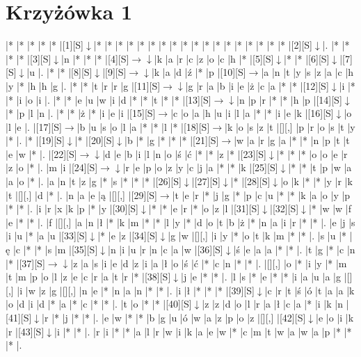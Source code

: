 \documentclass[11pt]{article}
\newcommand\drarr{$\rightarrow \!\!\!\!\! \downarrow$}
\newcommand\rarr{$\rightarrow$}
\newcommand\darr{$\downarrow$}
\begin{document}
\newpage\section*{Krzyżówka 1}

\noindent\begin{Puzzle}{24}{32}|*	|*	|*	|*	|*	|[1][S]\darr	|*	|*	|*	|*	|*	|*	|*	|*	|*	|*	|*	|*	|*	|*	|*	|*	|*	|*	|[2][S]\darr	|.
|*	|*	|*	|*	|[3][S]\darr	|n	|*	|*	|*	|[4][S]\drarr	|k	|a	|r	|c	|z	|o	|c	|h	|*	|[5][S]\darr	|*	|*	|[6][S]\darr	|[7][S]\darr	|u	|.
|*	|*	|[8][S]\darr	|[9][S]\drarr	|k	|a	|d	|ź	|*	|p	|[10][S]\rarr	|a	|n	|t	|y	|s	|z	|a	|c	|h	|y	|*	|h	|h	|g	|.
|*	|*	|t	|r	|r	|g	|[11][S]\drarr	|g	|r	|a	|b	|i	|e	|ż	|c	|a	|*	|*	|[12][S]\darr	|i	|*	|*	|i	|o	|i	|.
|*	|*	|e	|u	|w	|i	|d	|*	|*	|t	|*	|*	|[13][S]\drarr	|n	|p	|r	|*	|*	|h	|p	|[14][S]\darr	|*	|p	|l	|n	|.
|*	|*	|ż	|*	|i	|e	|i	|[15][S]\rarr	|c	|o	|a	|h	|u	|i	|l	|a	|*	|*	|i	|e	|k	|[16][S]\darr	|o	|l	|e	|.
|[17][S]\rarr	|b	|u	|s	|o	|l	|a	|*	|*	|l	|*	|[18][S]\rarr	|k	|o	|s	|z	|t	|[][,]{ }	|p	|r	|o	|s	|t	|y	|*	|.
|*	|[19][S]\darr	|*	|[20][S]\darr	|b	|*	|g	|*	|*	|*	|[21][S]\rarr	|w	|a	|r	|g	|a	|*	|*	|n	|p	|t	|t	|e	|w	|*	|.
|[22][S]\drarr	|d	|e	|b	|i	|l	|n	|o	|ś	|ć	|*	|*	|z	|*	|[23][S]\darr	|*	|*	|*	|o	|o	|e	|r	|z	|o	|*	|.
|m	|i	|[24][S]\drarr	|r	|e	|p	|o	|z	|y	|c	|j	|a	|*	|*	|k	|[25][S]\darr	|*	|*	|t	|p	|w	|a	|a	|o	|*	|.
|a	|n	|t	|z	|g	|*	|s	|*	|*	|*	|[26][S]\darr	|[27][S]\darr	|*	|[28][S]\darr	|o	|k	|*	|*	|y	|r	|k	|t	|[][,]{ }	|d	|*	|.
|n	|a	|e	|ą	|[][,]{ }	|[29][S]\rarr	|t	|e	|r	|*	|j	|g	|*	|p	|c	|u	|*	|*	|k	|a	|o	|y	|p	|*	|*	|.
|i	|r	|x	|k	|p	|*	|y	|[30][S]\darr	|*	|*	|e	|r	|*	|o	|z	|l	|[31][S]\darr	|[32][S]\darr	|*	|w	|w	|f	|e	|*	|*	|.
|f	|[][,]{ }	|a	|n	|ł	|*	|k	|m	|*	|*	|l	|y	|*	|d	|o	|t	|b	|ż	|*	|n	|a	|i	|r	|*	|*	|.
|e	|j	|s	|i	|u	|*	|a	|u	|[33][S]\darr	|*	|e	|z	|[34][S]\darr	|g	|w	|[][,]{ }	|i	|y	|*	|o	|t	|k	|m	|*	|*	|.
|s	|u	|*	|ę	|c	|*	|*	|s	|m	|[35][S]\darr	|n	|i	|u	|r	|n	|c	|a	|w	|[36][S]\darr	|ś	|e	|a	|a	|*	|*	|.
|t	|g	|*	|c	|n	|*	|[37][S]\drarr	|z	|a	|s	|i	|e	|d	|z	|i	|a	|ł	|o	|ś	|ć	|*	|c	|n	|*	|*	|.
|[][,]{ }	|o	|*	|i	|y	|*	|m	|t	|m	|p	|o	|l	|z	|e	|c	|r	|a	|t	|r	|*	|[38][S]\darr	|j	|e	|*	|*	|.
|l	|s	|*	|e	|*	|*	|i	|a	|u	|a	|g	|[][,]{ }	|i	|w	|z	|g	|[][,]{ }	|n	|e	|*	|n	|a	|n	|*	|*	|.
|i	|ł	|*	|*	|*	|[39][S]\darr	|c	|r	|t	|ś	|ó	|t	|a	|a	|k	|o	|d	|i	|d	|*	|a	|*	|c	|*	|*	|.
|t	|o	|*	|*	|[40][S]\darr	|z	|z	|d	|o	|l	|r	|a	|ł	|c	|a	|*	|i	|k	|n	|[41][S]\darr	|r	|*	|j	|*	|*	|.
|e	|w	|*	|*	|b	|g	|u	|ó	|w	|a	|z	|p	|o	|z	|[][,]{ }	|[42][S]\darr	|e	|o	|i	|k	|r	|[43][S]\darr	|i	|*	|*	|.
|r	|i	|*	|*	|a	|l	|r	|w	|i	|k	|a	|e	|w	|*	|c	|m	|t	|w	|a	|w	|a	|p	|*	|*	|*	|.

\end{Puzzle}
\end{document}
